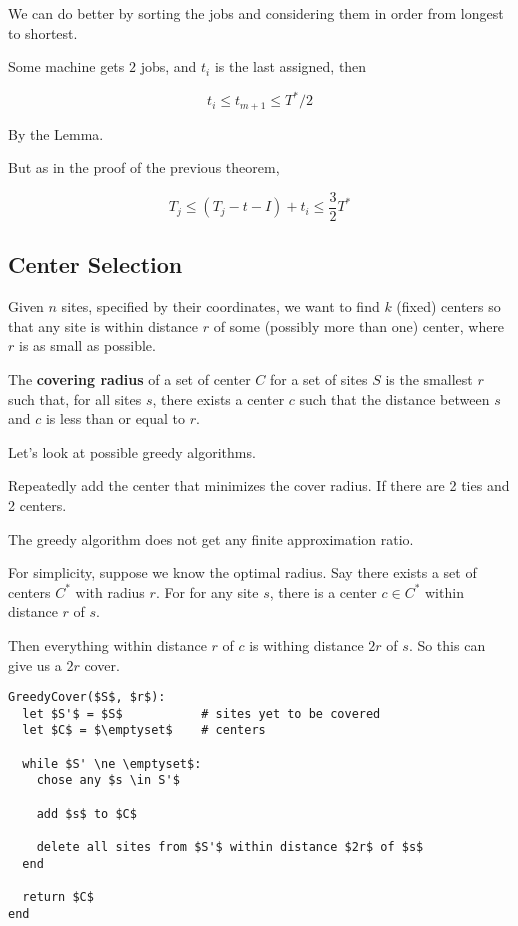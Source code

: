 \documentclass[12pt]{article}
\begin{document}
  We can do better by sorting the jobs and considering them in order from
  longest to shortest.

  {
    Some machine gets $2$ jobs, and $t_i$ is the last assigned, then %

    \[
      t_i \le t_{m + 1} \le T^* / 2
    \]

    By the Lemma.

    But as in the proof of the previous theorem,

    \[
      T_j \le (T_j - t-I) + t_i \le \frac{3}{2} T^*
    \]
  }

  \subsection{Center Selection}

  Given $n$ sites, specified by their coordinates, we want to find $k$ (fixed)
  centers so that any site is within distance $r$ of some (possibly more than
  one) center, where $r$ is as small as possible.

  {
    The {\bf covering radius} of a set of center $C$ for a set of sites $S$ is
    the smallest $r$ such that, for all sites $s$, there exists a center $c$
    such that the distance between $s$ and $c$ is less than or equal to $r$.
  }

  Let's look at possible greedy algorithms.

  Repeatedly add the center that minimizes the cover radius. If there are 2 ties
  and 2 centers.

  The greedy algorithm does not get any finite approximation ratio.

  For simplicity, suppose we know the optimal radius. Say there exists a set
  of centers $C^*$ with radius $r$. For for any site $s$, there is a center $c
  \in C^*$ within distance $r$ of $s$.

  Then everything within distance $r$ of $c$ is withing distance $2r$ of $s$. So
  this can give us a $2r$ cover.

  \begin{lstlisting}[]
GreedyCover($S$, $r$):
  let $S'$ = $S$           # sites yet to be covered
  let $C$ = $\emptyset$    # centers

  while $S' \ne \emptyset$:
    chose any $s \in S'$

    add $s$ to $C$

    delete all sites from $S'$ within distance $2r$ of $s$
  end

  return $C$
end
  \end{lstlisting}
  
\end{document}
